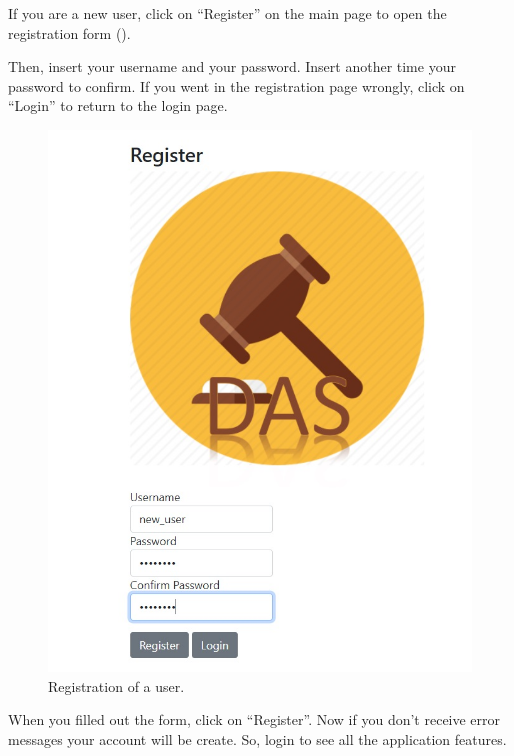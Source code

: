 If you are a new user, click on ``Register'' on the main page to open the
registration form ().

Then, insert your username and your password. Insert another time your password
to confirm. If you went in the registration page wrongly, click on ``Login'' to
return to the login page.

\begin{figure}[H]
	\includegraphics[width=\textwidth]{img/registration.jpg}
	\caption{Registration of a user.}\label{fig:registration}
\end{figure}

When you filled out the form, click on ``Register''. Now if you don’t receive
error messages your account will be create. So, login to see all the application
features.

